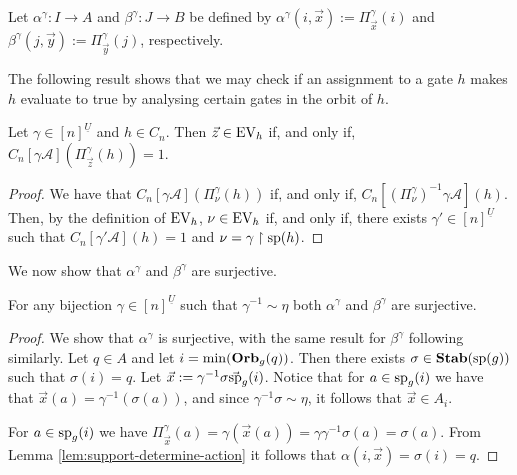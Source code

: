 \documentclass[../paper.tex]{subfiles}
\begin{document}
Let $\alpha^{\gamma}: I \rightarrow A$ and $\beta^{\gamma}: J \rightarrow B$ be
defined by $\alpha^{\gamma} (i, \vec{x}) := \Pi^{\gamma}_{\vec{x}}(i)$ and
$\beta^{\gamma} (j, \vec{y}) := \Pi^{\gamma}_{\vec{y}}(j)$, respectively.

The following result shows that we may check if an assignment to a gate $h$
makes $h$ evaluate to true by analysing certain gates in the orbit of $h$.

\begin{lem}
  Let $\gamma\in [n]^{\underline{U}}$ and $h \in C_n$. Then $\vec{z} \in \text{EV}_h$
  if, and only if, $C_n[\gamma \mathcal{A}](\Pi^{\gamma}_{\vec{z}} (h)) = 1$.
  \label{lem:translate-EV-circuits}
\end{lem}
\begin{proof}
  We have that $C_n[\gamma \mathcal{A}](\Pi^{\gamma}_\nu(h))$ if, and only if,
  $C_n[(\Pi^{\gamma}_{\nu})^{-1}\gamma \mathcal{A}] (h)$. Then, by the
  definition of $\text{EV}_h$, $\nu \in \text{EV}_h$ if, and only if, there exists $\gamma'
  \in [n]^{\underline{U}}$ such that $C_n[\gamma' \mathcal{A}](h) = 1$ and $\nu
  = \gamma\restriction{\text{sp}(h)}$.
\end{proof}

We now show that $\alpha^{\gamma}$ and $\beta^{\gamma}$ are surjective.

\begin{lem} 
  For any bijection $\gamma \in [n]^{\underline{U}}$ such that $\gamma^{-1} \sim
  \eta$ both $\alpha^{\gamma}$ and $\beta^{\gamma}$ are surjective.
  \label{lem:alpha-beta-surjective}
\end{lem}
\begin{proof}
  We show that $\alpha^{\gamma}$ is surjective, with the same result for
  $\beta^{\gamma}$ following similarly. Let $q \in A$ and let $i = \min
  (\text{\textbf{Orb}}_{g} (q))$. Then there exists $\sigma \in \text{\textbf{Stab}} (\text{sp} (g))$ such that $\sigma
  (i) = q$. Let $\vec{x} := \gamma^{-1} \sigma \vec{\text{sp}}_g(i)$. Notice that
  for $a \in \text{sp}_g(i)$ we have that $\vec{x}(a) = \gamma^{-1} (\sigma (a))$,
  and since $\gamma^{-1} \sigma \sim \eta$, it follows that $\vec{x} \in A_i$.

  For $a \in \text{sp}_g(i)$ we have $\Pi^{\gamma}_{\vec{x}} (a) = \gamma
  (\vec{x}(a)) = \gamma \gamma^{-1} \sigma (a) = \sigma (a)$. From Lemma
  \ref{lem:support-determine-action} it follows that $\alpha(i, \vec{x}) =
  \sigma(i) = q$.
\end{proof}

\end{document}
